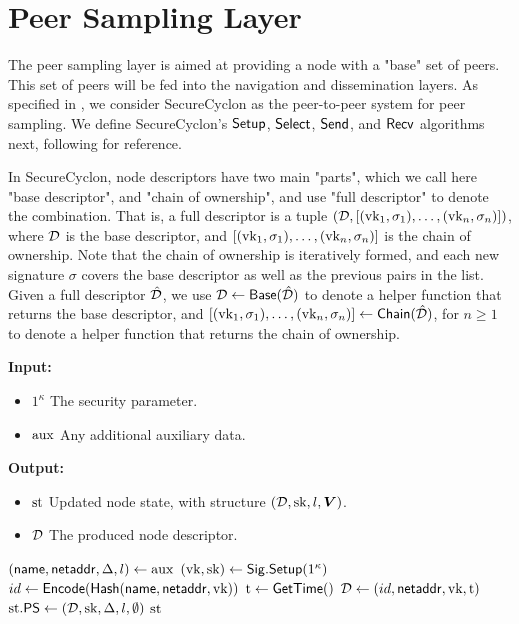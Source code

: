 \section{Peer Sampling Layer}
\label{sec:peersampling}

The peer sampling layer is aimed at providing a node with a "base" set of peers. This set of peers will be fed into the navigation and dissemination layers. As specified in \cite{akv24}, we consider SecureCyclon as the peer-to-peer system for peer sampling. We define SecureCyclon's $\mathsf{Setup}$, $\mathsf{Select}$, $\mathsf{Send}$, and $\mathsf{Recv}$ algorithms next, following \cite{as23} for reference.

In SecureCyclon, node descriptors have two main "parts", which we call here "base descriptor", and "chain of ownership", and use "full descriptor" to denote the combination. That is, a full descriptor is a tuple $(\mathcal{D},[(\text{vk}_1,\sigma_1),\dots,(\text{vk}_n,\sigma_n)])$, where $\mathcal{D}$ is the base descriptor, and $[(\text{vk}_1,\sigma_1),\dots,(\text{vk}_n,\sigma_n)]$ is the chain of ownership. Note that the chain of ownership is iteratively formed, and each new signature $\sigma$ covers the base descriptor as well as the previous pairs in the list. Given a full descriptor $\mathcal{\hat{D}}$, we use $\mathcal{D} \gets \mathsf{Base}(\mathcal{\hat{D}})$ to denote a helper function that returns the base descriptor, and $[(\text{vk}_1,\sigma_1),\dots,(\text{vk}_n,\sigma_n)] \gets \mathsf{Chain}(\mathcal{\hat{D}})$, for $n \ge 1$ to denote a helper function that returns the chain of ownership.

\begin{algorithm}[H]
\caption{\pssetup}
\label{alg:pssetup}
\textbf{Input:}
\begin{itemize}
\vspace{-.8em}
\itemsep0em 
    \item $1^\kappa$ The security parameter.
    \item $\text{aux}$ Any additional auxiliary data.
\end{itemize}
\textbf{Output:}
\begin{itemize}
\vspace{-.8em}
\itemsep0em 
    \item $\text{st}$ Updated node state, with structure $(\mathcal{D},\text{sk},l,\boldsymbol{V})$.
    \item $\mathcal{D}$ The produced node descriptor.
\end{itemize}
\begin{algorithmic}
    \State $(\mathsf{name},\mathsf{netaddr},\Delta,l) \gets \text{aux}$
    \State $(\text{vk},\text{sk}) \gets \mathsf{Sig}.\mathsf{Setup}(1^\kappa)$
    \State $id \gets \mathsf{Encode}(\mathsf{Hash}(\mathsf{name},\mathsf{netaddr},\text{vk}))$ 
    \State $\text{t} \gets \mathsf{GetTime}()$
    \State $\mathcal{D} \gets (id,\mathsf{netaddr},\text{vk},\text{t})$
    \State $\text{st}.\mathsf{PS} \gets (\mathcal{D},\text{sk},\Delta,l,\emptyset)$ 
    \State \return $\text{st}$
\end{algorithmic}
\end{algorithm}

